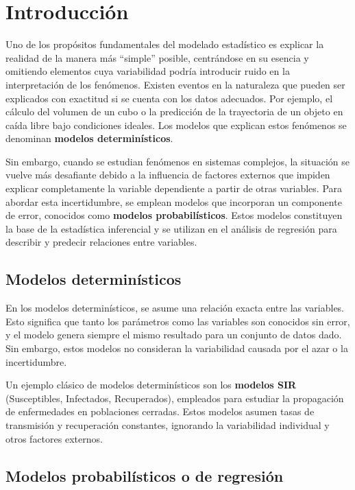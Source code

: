 \documentclass[
  spanish,
  a4paper,
]{scrbook}
\begin{document}
\section{Introducción}\label{introducciuxf3n-11}

Uno de los propósitos fundamentales del modelado estadístico es explicar
la realidad de la manera más ``simple'' posible, centrándose en su
esencia y omitiendo elementos cuya variabilidad podría introducir ruido
en la interpretación de los fenómenos. Existen eventos en la naturaleza
que pueden ser explicados con exactitud si se cuenta con los datos
adecuados. Por ejemplo, el cálculo del volumen de un cubo o la
predicción de la trayectoria de un objeto en caída libre bajo
condiciones ideales. Los modelos que explican estos fenómenos se
denominan \textbf{modelos determinísticos}.

Sin embargo, cuando se estudian fenómenos en sistemas complejos, la
situación se vuelve más desafiante debido a la influencia de factores
externos que impiden explicar completamente la variable dependiente a
partir de otras variables. Para abordar esta incertidumbre, se emplean
modelos que incorporan un componente de error, conocidos como
\textbf{modelos probabilísticos}. Estos modelos constituyen la base de
la estadística inferencial y se utilizan en el análisis de regresión
para describir y predecir relaciones entre variables.

\subsection{Modelos determinísticos}\label{modelos-determinuxedsticos}

En los modelos determinísticos, se asume una relación exacta entre las
variables. Esto significa que tanto los parámetros como las variables
son conocidos sin error, y el modelo genera siempre el mismo resultado
para un conjunto de datos dado. Sin embargo, estos modelos no consideran
la variabilidad causada por el azar o la incertidumbre.

Un ejemplo clásico de modelos determinísticos son los \textbf{modelos
SIR} (Susceptibles, Infectados, Recuperados), empleados para estudiar la
propagación de enfermedades en poblaciones cerradas. Estos modelos
asumen tasas de transmisión y recuperación constantes, ignorando la
variabilidad individual y otros factores externos.

\subsection{Modelos probabilísticos o de
regresión}\label{modelos-probabiluxedsticos-o-de-regresiuxf3n}
\end{document}
